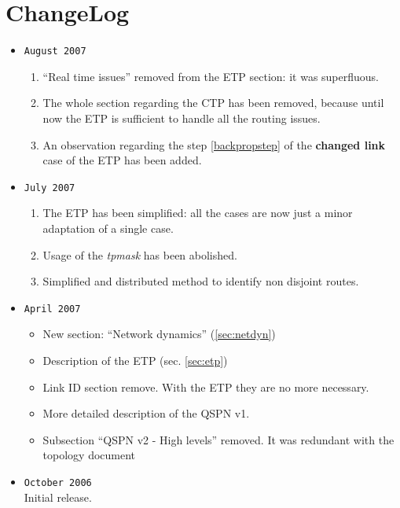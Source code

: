 \documentclass[a4paper]{article}
\begin{document}
\section{ChangeLog}
\begin{itemize}
	\item \verb|August 2007|
		\begin{enumerate}
			\item ``Real time issues'' removed from the ETP
				section: it was superfluous.
			\item The whole section regarding the CTP has been
				removed, because until now the ETP is
				sufficient to handle all the routing issues.
			\item An observation regarding the step
				\ref{backpropstep} of the \textbf{changed
				link} case of the ETP has been added.
		\end{enumerate}
	\item \verb|July 2007|
		\begin{enumerate}
			\item The ETP has been simplified: all the cases are 
				now just a minor adaptation of a single case.
			\item Usage of the \emph{tpmask} has been abolished.
			\item Simplified and distributed method to identify
				non disjoint routes.
		\end{enumerate}
	\item \verb|April 2007|
		\begin{itemize}
			\item New section: ``Network dynamics'' (\ref{sec:netdyn})
			\item Description of the ETP (sec.  \ref{sec:etp})
			\item Link ID section remove. With the ETP they are no
				more necessary.
			\item More detailed description of the QSPN v1.
			\item Subsection ``QSPN v2 - High levels'' removed. It
				was redundant with the topology
				document\cite{ntktopology}
		\end{itemize}
	\item \verb|October 2006|\\
		Initial release.
\end{itemize}

\end{document}
